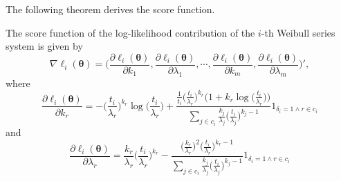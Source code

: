 \documentclass[
]{article}
\begin{document}
The following theorem derives the score function.

\begin{theorem}
\label{thm:weibull_score}
The score function of the log-likelihood contribution of the $i$-th Weibull series
system is given by
\begin{equation}
\label{eq:weibull_score}
\nabla \ell_i(\boldsymbol{\theta}) = \biggl(
    \frac{\partial \ell_i(\boldsymbol{\theta})}{\partial k_1},
    \frac{\partial \ell_i(\boldsymbol{\theta})}{\partial \lambda_1},
    \cdots, 
    \frac{\partial \ell_i(\boldsymbol{\theta})}{\partial k_m},
    \frac{\partial \ell_i(\boldsymbol{\theta})}{\partial \lambda_m} \biggr)',
\end{equation}
where
\begin{equation}
\frac{\partial \ell_i(\boldsymbol{\theta})}{\partial k_r} = 
    -\biggl(\frac{t_i}{\lambda_r}\biggr)^{k_r}    
        \!\!\log\biggl(\frac{t_i}{\lambda_r}\biggr) +
        \frac{\frac{1}{t_i} \bigl(\frac{t_i}{\lambda_r}\bigr)^{k_r}
            \bigl(1+ k_r \log\bigl(\frac{t_i}{\lambda_r}\bigr)\bigr)}
            {\sum_{j \in c_i} \frac{k_j}{\lambda_j}\bigl(\frac{t_i}{\lambda_j}\bigr)^{k_j-1}}
        1_{\delta_i = 1 \land r \in c_i}
\end{equation}
and 
\begin{equation}
\frac{\partial \ell_i(\boldsymbol{\theta})}{\partial \lambda_r} = 
    \frac{k_r}{\lambda_r} \biggl(\frac{t_i}{\lambda_r}\biggr)^{k_r} -
    \frac{
        \bigl(\frac{k_r}{\lambda_r}\bigr)^2 \bigl(\frac{t_i}{\lambda_r}\bigr)^{k_r - 1}
    }
    {
        \sum_{j \in c_i} \frac{k_j}{\lambda_j}\bigl(\frac{t_i}{\lambda_j}\bigr)^{k_j-1}
    }
    1_{\delta_i = 1 \land r \in c_i}
\end{equation}
\end{theorem}
\end{document}

